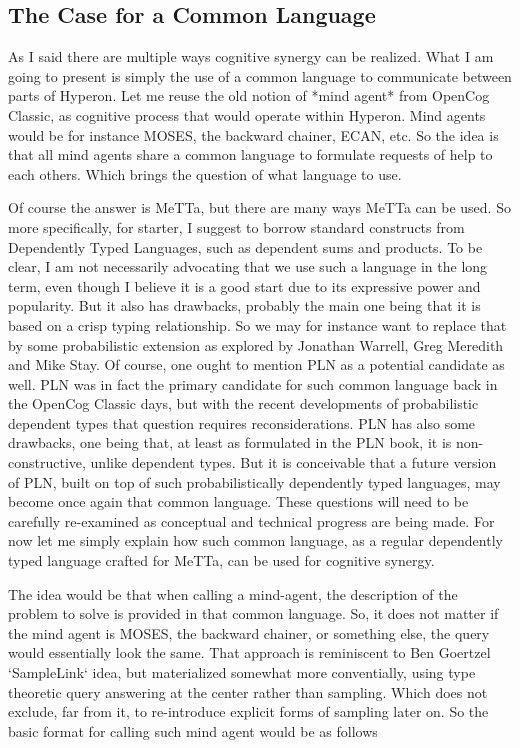 \documentclass[]{report}
\begin{document}
\subsection{The Case for a Common Language}

As I said there are multiple ways cognitive synergy can be realized.
What I am going to present is simply the use of a common language to
communicate between parts of Hyperon.  Let me reuse the old notion of
*mind agent* from OpenCog Classic, as cognitive process that would
operate within Hyperon.  Mind agents would be for instance MOSES, the
backward chainer, ECAN, etc.  So the idea is that all mind agents
share a common language to formulate requests of help to each others.
Which brings the question of what language to use.

Of course the answer is MeTTa, but there are many ways MeTTa can be
used.  So more specifically, for starter, I suggest to borrow standard
constructs from Dependently Typed Languages, such as dependent sums
and products.  To be clear, I am not necessarily advocating that we
use such a language in the long term, even though I believe it is a
good start due to its expressive power and popularity.  But it also
has drawbacks, probably the main one being that it is based on a crisp
typing relationship.  So we may for instance want to replace that by
some probabilistic extension as explored by Jonathan Warrell, Greg
Meredith and Mike Stay.  Of course, one ought to mention PLN as a
potential candidate as well.  PLN was in fact the primary candidate
for such common language back in the OpenCog Classic days, but with
the recent developments of probabilistic dependent types that question
requires reconsiderations.  PLN has also some drawbacks, one being
that, at least as formulated in the PLN book, it is non-constructive,
unlike dependent types.  But it is conceivable that a future version
of PLN, built on top of such probabilistically dependently typed
languages, may become once again that common language.  These
questions will need to be carefully re-examined as conceptual and
technical progress are being made.  For now let me simply explain how
such common language, as a regular dependently typed language crafted
for MeTTa, can be used for cognitive synergy.

The idea would be that when calling a mind-agent, the description of
the problem to solve is provided in that common language.  So, it does
not matter if the mind agent is MOSES, the backward chainer, or
something else, the query would essentially look the same.  That
approach is reminiscent to Ben Goertzel `SampleLink` idea, but
materialized somewhat more conventially, using type theoretic query
answering at the center rather than sampling.  Which does not exclude,
far from it, to re-introduce explicit forms of sampling later on.  So
the basic format for calling such mind agent would be as follows
\end{document}
